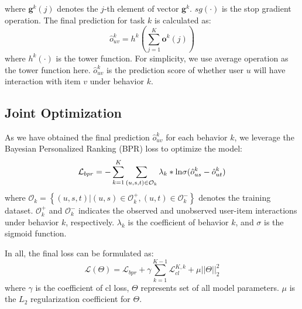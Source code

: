 where $\mathbf{g}^{k}(j)$ denotes the $j$-th element of vector $\mathbf{g}^{k}$. $sg(\cdot)$ is the stop gradient operation. The final prediction for task $k$ is calculated as:
\begin{equation}
\hat{o}_{uv}^{k} = h^{k}(\sum_{j=1}^{K} {\mathbf{o}^{k}(j)})
\end{equation}
where $h^{k}(\cdot)$ is the tower function. For simplicity, we use average operation as the tower function here. $\hat{o}_{uv}^{k}$ is the prediction score of whether user $u$ will have interaction with item $v$ under behavior $k$.

\subsection{Joint Optimization}
As we have obtained the final prediction $\hat{o}_{uv}^{k}$ for each behavior 
$k$, we leverage the Bayesian Personalized Ranking (BPR)\cite{bpr} loss to optimize the model:
\begin{equation}
\mathcal{L}_{bpr} = -\sum_{k=1}^{K}\sum_{(u,s,t)\in \mathcal{O}_k} \lambda_k * \textup{ln} \sigma(\hat{o}_{us}^{k} - \hat{o}_{ut}^{k})
\end{equation}
where $\mathcal{O}_k = \left\{(u,s,t)|(u,s)\in \mathcal{O}_k^{+}, (u,t) \in \mathcal{O}_k^{-} \right\}$ denotes the training dataset. $\mathcal{O}_k^+$ and $\mathcal{O}_k^-$ indicates the observed and unobserved user-item interactions under behavior $k$, respectively. $\lambda_k$ is the coefficient of behavior $k$, and $\sigma$ is the sigmoid function.

In all, the final loss can be formulated as:
\begin{equation}
    \mathcal{L}(\Theta) = \mathcal{L}_{bpr} + \gamma \sum_{k=1}^{K - 1}\mathcal{L}_{cl}^{K,k} + \mu ||\Theta||^2_2
\end{equation}
where $\gamma$ is the coefficient of cl loss, $\Theta$ represents set of all model parameters. $\mu$ is the $L_2$ regularization coefficient for $\Theta$.

